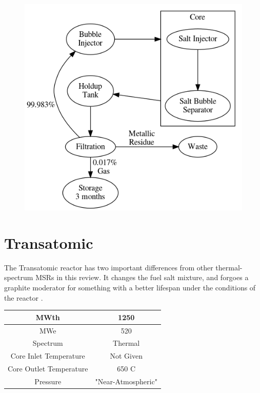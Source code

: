 \documentclass[letterpaper]{article}
\begin{document}
\begin{figure}[H]
  \centering
  \includegraphics[height=.5\textheight]{figures/msfr-offgas.png}
  \label{fig:figI}
\end{figure}

\section{Transatomic}

The Transatomic reactor has two important differences from other thermal-spectrum MSRs in this review.  It changes the fuel salt mixture, and forgoes a graphite moderator for something with a better lifespan under the conditions of the reactor \cite{robertson_assessment_2017} \cite{transatomic_power_corporation_neutronics_2016} \cite{transatomic_power_corporation_technical_2016}.

\begin{center}
\begin{tabular}{|c|c|}
\hline
MWth & 1250 \\
\hline
MWe & 520 \\
\hline
Spectrum & Thermal \\
\hline
Core Inlet Temperature & Not Given \\
\hline
Core Outlet Temperature & 650 C\\
\hline
Pressure & "Near-Atmospheric" \\
\hline
\end{tabular}
\end{center}
\end{document}
